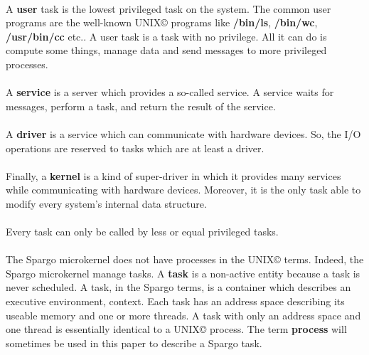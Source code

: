 \documentclass[10pt,a4wide]{article}
\begin{document}
\begin{multicols}{2}
\paragraph{}

A \textbf{user} task is the lowest privileged task on the system.
The common user programs are the well-known UNIX{\scriptsize \copyright}
programs like \textbf{/bin/ls}, \textbf{/bin/wc}, \textbf{/usr/bin/cc} etc..
A user task is a task with no privilege. All it can do is compute some things,
manage data and send messages to more privileged processes.

\paragraph{}

A \textbf{service} is a server which provides a so-called service. A service
waits for messages, perform a task, and return the result of the service.

\paragraph{}

A \textbf{driver} is a service which can communicate with hardware devices.
So, the I/O operations are reserved to tasks which are at least a driver.

\paragraph{}

Finally, a \textbf{kernel} is a kind of super-driver in which it provides
many services while communicating with hardware devices. Moreover, it is
the only task able to modify every system's internal data structure.

\paragraph{}

Every task can only be called by less or equal privileged tasks.

\paragraph{}

The Spargo microkernel does not have processes in the
UNIX{\scriptsize \copyright} terms. Indeed, the Spargo microkernel manage tasks.
A \textbf{task} is a non-active entity because a task is never scheduled.
A task, in the Spargo terms, is a container which describes an executive
environment, context. Each task has an address space describing its useable
memory and one or more threads. A task with only an address space and one
thread is essentially identical to a UNIX{\scriptsize \copyright} process.
The term \textbf{process} will sometimes be used in this paper to describe
a Spargo task.


\end{multicols}
\end{document}
